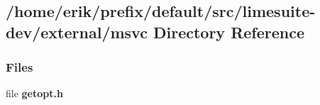 \subsection{/home/erik/prefix/default/src/limesuite-\/dev/external/msvc Directory Reference}
\label{dir_a5924ed9b850ca4dbd780fe11eca39f8}
\subsubsection*{Files}
\begin{DoxyCompactItemize}
\item 
file {\bf getopt.\+h}
\end{DoxyCompactItemize}
